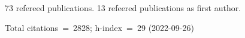 73 refereed publications. 13 refeered publications as first author.

Total citations~=~2828; h-index~=~29 (2022-09-26)